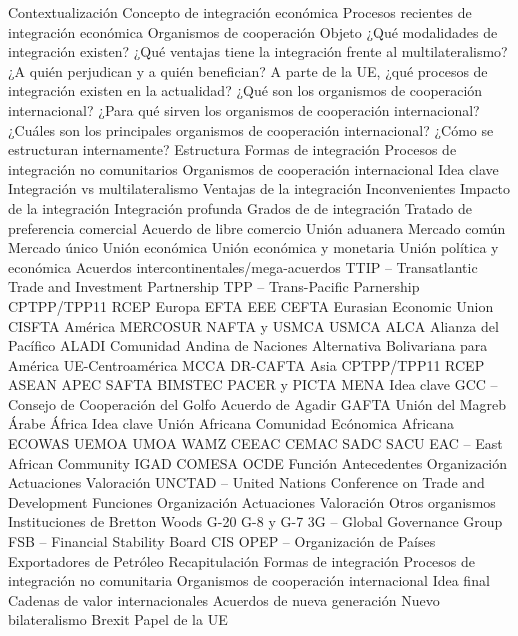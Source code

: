 \documentclass{nuevotema}
\begin{document}
\begin{esquema}[enumerate]
	\1[] 
		\2 Contextualización
			\3 Concepto de integración económica
			\3 Procesos recientes de integración económica
			\3 Organismos de cooperación
		\2 Objeto
			\3 ¿Qué modalidades de integración existen?
			\3 ¿Qué ventajas tiene la integración frente al multilateralismo?
			\3 ¿A quién perjudican y a quién benefician?
			\3 A parte de la UE, ¿qué procesos de integración existen en la actualidad?
			\3 ¿Qué son los organismos de cooperación internacional?
			\3 ¿Para qué sirven los organismos de cooperación internacional?
			\3 ¿Cuáles son los principales organismos de cooperación internacional?
			\3 ¿Cómo se estructuran internamente?
		\2 Estructura
			\3 Formas de integración
			\3 Procesos de integración no comunitarios
			\3 Organismos de cooperación internacional
	\1 
		\2 Idea clave
			\3 Integración vs multilateralismo
			\3 Ventajas de la integración
			\3 Inconvenientes
			\3 Impacto de la integración
			\3 Integración profunda
		\2 Grados de de integración
			\3 Tratado de preferencia comercial
			\3 Acuerdo de libre comercio
			\3 Unión aduanera
			\3 Mercado común
			\3 Mercado único
			\3 Unión económica
			\3 Unión económica y monetaria
			\3 Unión política y económica
	\1 
		\2 Acuerdos intercontinentales/mega-acuerdos
			\3 TTIP -- Transatlantic Trade and Investment Partnership
			\3 TPP -- Trans-Pacific Parnership
			\3 CPTPP/TPP11
			\3 RCEP
		\2 Europa
			\3 EFTA
			\3 EEE
			\3 CEFTA
			\3 Eurasian Economic Union
			\3 CISFTA
		\2 América
			\3 MERCOSUR
			\3 NAFTA y USMCA
			\3 USMCA
			\3 ALCA
			\3 Alianza del Pacífico
			\3 ALADI
			\3 Comunidad Andina de Naciones
			\3 Alternativa Bolivariana para América
			\3 UE-Centroamérica
			\3 MCCA
			\3 DR-CAFTA
		\2 Asia
			\3 CPTPP/TPP11
			\3 RCEP
			\3 ASEAN
			\3 APEC
			\3 SAFTA
			\3 BIMSTEC
			\3 PACER y PICTA
		\2 MENA
			\3 Idea clave
			\3 GCC -- Consejo de Cooperación del Golfo
			\3 Acuerdo de Agadir
			\3 GAFTA
			\3 Unión del Magreb Árabe
		\2 África
			\3 Idea clave
			\3 Unión Africana
			\3 Comunidad Ecónomica Africana
			\3 ECOWAS
			\3 UEMOA
			\3 UMOA
			\3 WAMZ
			\3 CEEAC
			\3 CEMAC
			\3 SADC
			\3 SACU
			\3 EAC -- East African Community
			\3 IGAD
			\3 COMESA
	\1 
		\2 OCDE
			\3 Función
			\3 Antecedentes
			\3 Organización
			\3 Actuaciones
			\3 Valoración
		\2 UNCTAD -- United Nations Conference on Trade and Development
			\3 Funciones
			\3 Organización
			\3 Actuaciones
			\3 Valoración
		\2 Otros organismos
			\3 Instituciones de Bretton Woods
			\3 G-20
			\3 G-8 y G-7
			\3 3G -- Global Governance Group
			\3 FSB -- Financial Stability Board
			\3 CIS
			\3 OPEP -- Organización de Países Exportadores de Petróleo
	\1[] 
		\2 Recapitulación
			\3 Formas de integración
			\3 Procesos de integración no comunitaria
			\3 Organismos de cooperación internacional
		\2 Idea final
			\3 Cadenas de valor internacionales
			\3 Acuerdos de nueva generación
			\3 Nuevo bilateralismo
			\3 Brexit
			\3 Papel de la UE

\end{esquema}
\end{document}
